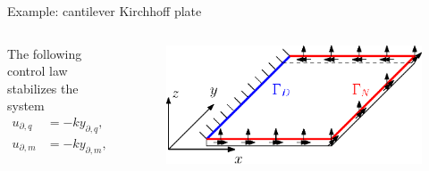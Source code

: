 \documentclass[aspectratio=169]{ISAE-Beamer}
\begin{document}
\begin{frame}{Example: cantilever Kirchhoff plate}
\begin{columns}
\begin{column}{.5\textwidth}
		The following control law stabilizes the system
		\begin{equation*}
		\begin{aligned}
		u_{\partial, q} & = - k y_{\partial, q}, \\
		u_{\partial, m} & = - k y_{\partial, m}, \\
		\end{aligned} \qquad k>0.
		\end{equation*}
		
	\end{column}

	\begin{column}{.5\textwidth}
		\begin{figure}[b]
			\centering
			\includegraphics[width=0.9\columnwidth]{part_3/applications/bs_Kirchh/plate_controlled.eps}
		\end{figure}
	\end{column}
\end{columns}

\end{frame}
\end{document}
